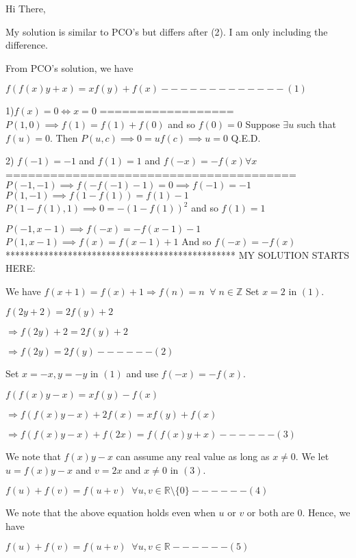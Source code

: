 \begin{solution}
	Hi There, 

  My solution is similar to PCO's but differs after (2). I am only including the difference.

From PCO's solution, we have 

$ f(f(x)y + x) = xf(y) + f(x) - - - - - - - - - - - - - (1)$

1)$ f(x) = 0 \iff x = 0$
==================
$ P(1,0) \implies f(1) = f(1) + f(0)$ and so $ f(0) = 0$
Suppose $ \exists u$ such that $ f(u) = 0$. Then $ P(u,c) \implies 0 = uf(c) \implies u = 0$
Q.E.D.

2) $ f( - 1) = - 1$ and $ f(1) = 1$ and $ f( - x) = - f(x) \forall x$
=======================================
$ P( - 1, - 1) \implies f( - f( - 1) - 1) = 0 \implies f( - 1) = - 1$
$ P(1, - 1) \implies f(1 - f(1)) = f(1) - 1$
$ P(1 - f(1),1) \implies 0 = - (1 - f(1))^2$ and so $ f(1) = 1$

$ P( - 1,x - 1) \implies f( - x) = - f(x - 1) - 1$
$ P(1,x - 1) \implies f(x) = f(x - 1) + 1$
And so $ f( - x) = - f(x)$
************************************************
MY SOLUTION STARTS HERE: 

We have $ f(x + 1) = f(x) + 1 \Rightarrow f(n) = n \;\;\forall \;n \in \mathbb{Z}$
Set $ x = 2$ in $ (1)$.

$ f(2y + 2) = 2f(y) + 2$ 

$ \Rightarrow f(2y) + 2 = 2f(y) + 2$ 

$ \Rightarrow f(2y) = 2f(y) - - - - - - (2)$

Set $ x = - x, y = - y$ in $ (1)$ and use $ f( - x) = - f(x)$.

$ f(f(x)y - x) = xf(y) - f(x)$ 

$ \Rightarrow f(f(x)y - x) + 2f(x) = xf(y) + f(x)$ 

$ \Rightarrow f(f(x)y - x) + f(2x) = f(f(x)y + x) - - - - - - (3)$

We note that $ f(x)y - x$ can assume any real value as long as $ x\neq 0$. 
We let $ u = f(x)y - x$ and $ v = 2x$ and $ x\neq 0$ in $ (3)$.

$ f(u) + f(v) = f(u + v) \;\;\forall u,v \in \mathbb{R}\setminus\{0\} - - - - - - (4)$

We note that the above equation holds even when $ u$ or $ v$ or both are 0.
Hence, we have 

$ f(u) + f(v) = f(u + v) \;\;\forall u,v \in \mathbb{R} - - - - - - (5)$


\end{solution}
